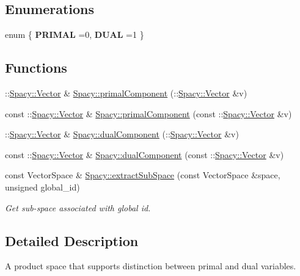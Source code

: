 \subsection*{Enumerations}
\begin{DoxyCompactItemize}
\item 
enum \{ {\bfseries P\-R\-I\-M\-A\-L} =0, 
{\bfseries D\-U\-A\-L} =1
 \}
\end{DoxyCompactItemize}
\subsection*{Functions}
\begin{DoxyCompactItemize}
\item 
\-::\hyperlink{classSpacy_1_1Vector}{Spacy\-::\-Vector} \& \hyperlink{group__ProductSpaceGroup_gaa040ba5c24284687e0df19c99dd688a6}{Spacy\-::primal\-Component} (\-::\hyperlink{classSpacy_1_1Vector}{Spacy\-::\-Vector} \&v)
\item 
const \-::\hyperlink{classSpacy_1_1Vector}{Spacy\-::\-Vector} \& \hyperlink{group__ProductSpaceGroup_ga88c5bcc74072f75c63ab7d9448f80a7e}{Spacy\-::primal\-Component} (const \-::\hyperlink{classSpacy_1_1Vector}{Spacy\-::\-Vector} \&v)
\item 
\-::\hyperlink{classSpacy_1_1Vector}{Spacy\-::\-Vector} \& \hyperlink{group__ProductSpaceGroup_gafe51c084e3b03205db94e91309e834f7}{Spacy\-::dual\-Component} (\-::\hyperlink{classSpacy_1_1Vector}{Spacy\-::\-Vector} \&v)
\item 
const \-::\hyperlink{classSpacy_1_1Vector}{Spacy\-::\-Vector} \& \hyperlink{group__ProductSpaceGroup_gabe5978657aab46b1575e2521b336407d}{Spacy\-::dual\-Component} (const \-::\hyperlink{classSpacy_1_1Vector}{Spacy\-::\-Vector} \&v)
\item 
\hypertarget{group__ProductSpaceGroup_ga6054e5c78652ac4959f5d521acadd86a}{const Vector\-Space \& \hyperlink{group__ProductSpaceGroup_ga6054e5c78652ac4959f5d521acadd86a}{Spacy\-::extract\-Sub\-Space} (const Vector\-Space \&space, unsigned global\-\_\-id)}\label{group__ProductSpaceGroup_ga6054e5c78652ac4959f5d521acadd86a}

\begin{DoxyCompactList}\small\item\em Get sub-\/space associated with global id. \end{DoxyCompactList}\end{DoxyCompactItemize}


\subsection{Detailed Description}
A product space that supports distinction between primal and dual variables. 

